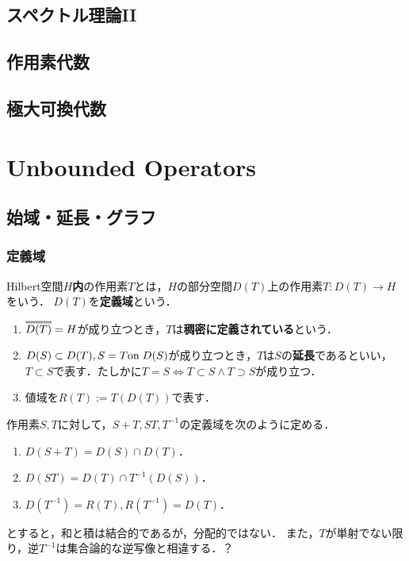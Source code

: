 \documentclass[uplatex,dvipdfmx]{jsreport}
\begin{document}
\section{スペクトル理論II}

\section{作用素代数}

\section{極大可換代数}

\chapter{Unbounded Operators}

\section{始域・延長・グラフ}

\subsection{定義域}

\begin{definition}
    Hilbert空間$H$\textbf{内}の作用素$T$とは，$H$の部分空間$D(T)$上の作用素$T:D(T)\to H$をいう．
    $D(T)$を\textbf{定義域}という．
    \begin{enumerate}
        \item $\oo{D(T)}=H$が成り立つとき，$T$は\textbf{稠密に定義されている}という．
        \item $D(S)\subset D(T),S=T\mathrm{on}\; D(S)$が成り立つとき，$T$は$S$の\textbf{延長}であるといい，$T\subset S$で表す．たしかに$T=S\Leftrightarrow T\subset S\land T\supset S$が成り立つ．
        \item 値域を$R(T):=T(D(T))$で表す．
    \end{enumerate}
\end{definition}

\begin{definition}[定義域の演算]
    作用素$S,T$に対して，$S+T,ST,T^{-1}$の定義域を次のように定める．
    \begin{enumerate}
        \item $D(S+T)=D(S)\cap D(T)$．
        \item $D(ST)=D(T)\cap T^{-1}(D(S))$．
        \item $D(T^{-1})=R(T),R(T^{-1})=D(T)$．
    \end{enumerate}
    とすると，和と積は結合的であるが，分配的ではない．
    また，$T$が単射でない限り，逆$T^{-1}$は集合論的な逆写像と相違する．？
\end{definition}
\end{document}
